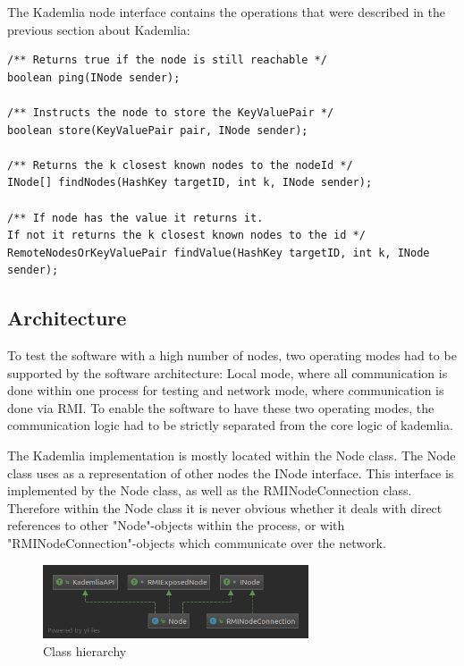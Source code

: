 \documentclass[a4paper, 12pt]{article} %
\begin{document}
The Kademlia node interface contains the operations that were described in the previous section about Kademlia:  

\begin{verbatim}
/** Returns true if the node is still reachable */
boolean ping(INode sender);

/** Instructs the node to store the KeyValuePair */
boolean store(KeyValuePair pair, INode sender);

/** Returns the k closest known nodes to the nodeId */
INode[] findNodes(HashKey targetID, int k, INode sender);

/** If node has the value it returns it. 
If not it returns the k closest known nodes to the id */
RemoteNodesOrKeyValuePair findValue(HashKey targetID, int k, INode sender);
\end{verbatim}

\subsection{Architecture}

To test the software with a high number of nodes, two operating modes had to be supported by the software architecture: Local mode, where all communication is done within one process for testing and network mode, where communication is done via RMI. To enable the software to have these two operating modes, the communication logic had to be strictly separated from the core logic of kademlia.

The Kademlia implementation is mostly located within the Node class. The Node class uses as a representation of other nodes the INode interface. This interface is implemented by the Node class, as well as the RMINodeConnection class. Therefore within the Node class it is never obvious whether it deals with direct references to other "Node"-objects within the process, or with "RMINodeConnection"-objects which communicate over the network.

\begin{figure}
    \begin{center}
    \includegraphics[width=0.7\textwidth]{images/Node.png}
    \end{center}
    \caption{Class hierarchy}   
\end{figure}
\end{document}
